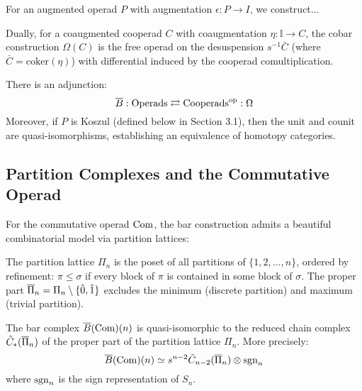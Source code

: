 For an augmented operad $P$ with augmentation $\epsilon: P \to I$, we construct...

\begin{definition}
Dually, for a coaugmented cooperad $C$ with coaugmentation $\eta : \mathbb{I} \to C$, the cobar construction $\Omega(C)$ is the free operad on the desuspension $s^{-1}\bar{C}$ (where $\bar{C} = \text{coker}(\eta)$) with differential induced by the cooperad comultiplication.
\end{definition}
 
\begin{theorem}
There is an adjunction:
\[
\overline{B} : \text{Operads} \rightleftarrows \text{Cooperads}^{\text{op}} : \Omega
\]
Moreover, if $P$ is Koszul (defined below in Section 3.1), then the unit and counit are quasi-isomorphisms, establishing an equivalence of homotopy categories.
\end{theorem}
 
\subsection{Partition Complexes and the Commutative Operad}
 
For the commutative operad $\operatorname{Com}$, the bar construction admits a beautiful combinatorial model via partition lattices:
 
\begin{definition}
The partition lattice $\Pi_n$ is the poset of all partitions of $\{1, 2, \ldots, n\}$, ordered by refinement: $\pi \leq \sigma$ if every block of $\pi$ is contained in some block of $\sigma$. The proper part $\overline{\Pi}_n = \Pi_n \setminus \{\hat{0}, \hat{1}\}$ excludes the minimum (discrete partition) and maximum (trivial partition).
\end{definition}
 
\begin{theorem}\label{thm:partition}
The bar complex $\overline{B}(\operatorname{Com})(n)$ is quasi-isomorphic to the reduced chain complex $\tilde{C}_*(\overline{\Pi}_n)$ of the proper part of the partition lattice $\Pi_n$. More precisely:
\[
\overline{B}(\operatorname{Com})(n) \simeq s^{n-2}\tilde{C}_{n-2}(\overline{\Pi}_n) \otimes \operatorname{sgn}_n
\]
where $\operatorname{sgn}_n$ is the sign representation of $S_n$.
\end{theorem}
 

